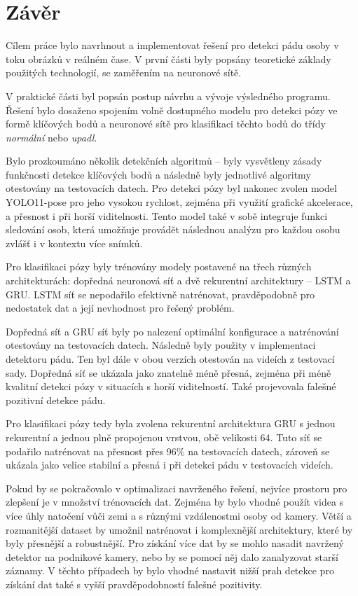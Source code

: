 \chapter{Závěr}
\label{chap:Conclusion}

Cílem práce bylo navrhnout a implementovat řešení pro detekci pádu osoby v toku
obrázků v reálném čase. V první části byly popsány teoretické základy použitých
technologií, se zaměřením na neuronové sítě.

V praktické části byl popsán postup návrhu a vývoje výsledného programu. Řešení
bylo dosaženo spojením volně dostupného modelu pro detekci pózy ve formě
klíčových bodů a neuronové sítě pro klasifikaci těchto bodů do třídy
\textit{normální} nebo \textit{upadl}.

Bylo prozkoumáno několik detekčních algoritmů – byly vysvětleny zásady
funkčnosti detekce klíčových bodů a následně byly jednotlivé algoritmy
otestovány na testovacích datech. Pro detekci pózy byl nakonec zvolen model
YOLO11-pose pro jeho vysokou rychlost, zejména při využití grafické akcelerace,
a přesnost i při horší viditelnosti. Tento model také v sobě integruje funkci
sledování osob, která umožňuje provádět následnou analýzu pro každou osobu
zvlášť i v kontextu více snímků.

Pro klasifikaci pózy byly trénovány modely postavené na třech různých
architekturách: dopředná neuronová síť a dvě rekurentní architektury – LSTM a
GRU. LSTM síť se nepodařilo efektivně natrénovat, pravděpodobně pro nedostatek
dat a její nevhodnost pro řešený problém.

Dopředná síť a GRU síť byly po nalezení optimální konfigurace a natrénování
otestovány na testovacích datech. Následně byly použity v implementaci
detektoru pádu. Ten byl dále v obou verzích otestován na videích z testovací
sady. Dopředná síť se ukázala jako znatelně méně přesná, zejména při méně
kvalitní detekci pózy v situacích s horší viditelností. Také projevovala
falešné pozitivní detekce pádu.

Pro klasifikaci pózy tedy byla zvolena rekurentní architektura GRU s jednou
rekurentní a jednou plně propojenou vrstvou, obě velikosti $64$. Tuto síť se
podařilo natrénovat na přesnost přes 96\% na testovacích datech, zároveň se
ukázala jako velice stabilní a přesná i při detekci pádu v testovacích videích.

Pokud by se pokračovalo v optimalizaci navrženého řešení, nejvíce prostoru pro zlepšení je v množství trénovacích dat. Zejména by bylo vhodné použít videa s více
úhly natočení vůči zemi a s různými vzdálenostmi osoby od kamery. Větší a
rozmanitější dataset by umožnil natrénovat i komplexnější architektury, které
by byly přesnější a robustnější. Pro získání více dat by se mohlo nasadit
navržený detektor na podnikové kamery, nebo by se pomocí něj dalo zanalyzovat
starší záznamy. V těchto případech by bylo vhodné nastavit nižší prah detekce
pro získání dat také s vyšší pravděpodobností falešné pozitivity.

